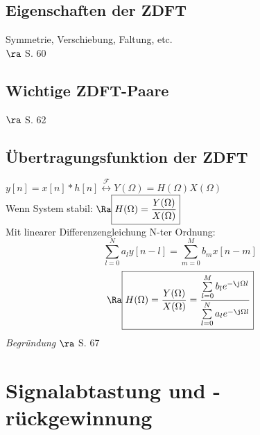 \documentclass[6pt,a4paper]{scrartcl}
\begin{document}
\begin{multicols}{4}
	\subsection*{Eigenschaften der ZDFT}
	Symmetrie, Verschiebung, Faltung, etc.\\
	$\ra$ S. 60
	
	\subsection*{Wichtige ZDFT-Paare}
	$\ra$ S. 62
	
	\subsection*{Übertragungsfunktion der ZDFT}
	$y[n] = x[n] \ast h[n] \stackrel{\mathcal{F}}{\longleftrightarrow} Y(\Omega) = H(\Omega) X(\Omega)$\\
	Wenn System stabil: $\Ra \boxed{H(\Omega) = \frac{Y(\Omega)}{X(\Omega)}}$\\
	Mit linearer Differenzengleichung N-ter Ordnung:
	\[\sum\limits_{l=0}^{N}{a_l y[n - l]} = \sum\limits_{m = 0}^{M}{b_m x[n - m]}\]
	\[\Ra \boxed{H(\Omega) = \frac{Y(\Omega)}{X(\Omega)} = \frac{\sum\limits_{l=0}^{M}{b_l e^{-\j\Omega l}}}{\sum\limits_{l=0}^{N}{a_l e^{-\j\Omega l}}}}\]
	\emph{Begründung} $\ra$ S. 67
	
\section{Signalabtastung und -rückgewinnung}

\end{multicols}
\end{document}
